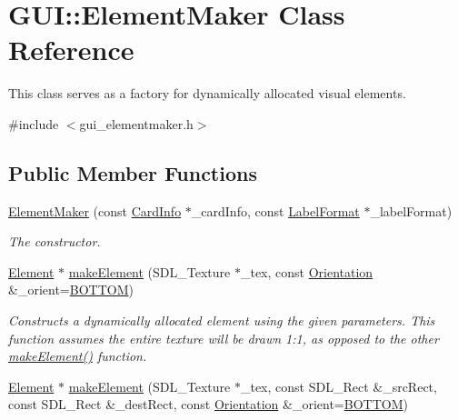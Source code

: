 \hypertarget{classGUI_1_1ElementMaker}{\section{G\-U\-I\-:\-:Element\-Maker Class Reference}
\label{classGUI_1_1ElementMaker}
}


This class serves as a factory for dynamically allocated visual elements.  




{\ttfamily \#include $<$gui\-\_\-elementmaker.\-h$>$}

\subsection*{Public Member Functions}
\begin{DoxyCompactItemize}
\item 
\hyperlink{classGUI_1_1ElementMaker_a5511a914978a82248057d5e12f2d4782}{Element\-Maker} (const \hyperlink{structGUI_1_1CardInfo}{Card\-Info} $\ast$\-\_\-card\-Info, const \hyperlink{structGUI_1_1LabelFormat}{Label\-Format} $\ast$\-\_\-label\-Format)
\begin{DoxyCompactList}\small\item\em The constructor. \end{DoxyCompactList}\item 
\hyperlink{classGUI_1_1Element}{Element} $\ast$ \hyperlink{classGUI_1_1ElementMaker_adc28a4059d3ae86c2dcb56dcc7edf728}{make\-Element} (S\-D\-L\-\_\-\-Texture $\ast$\-\_\-tex, const \hyperlink{namespaceGUI_a1a3a8094d47f7be06ce123fab38abf6a}{Orientation} \&\-\_\-orient=\hyperlink{namespaceGUI_a1a3a8094d47f7be06ce123fab38abf6aafb2c9cf323a63df7a7ac4ade2e4e63e5}{B\-O\-T\-T\-O\-M})
\begin{DoxyCompactList}\small\item\em Constructs a dynamically allocated element using the given parameters. This function assumes the entire texture will be drawn 1\-:1, as opposed to the other \hyperlink{classGUI_1_1ElementMaker_adc28a4059d3ae86c2dcb56dcc7edf728}{make\-Element()} function. \end{DoxyCompactList}\item 
\hyperlink{classGUI_1_1Element}{Element} $\ast$ \hyperlink{classGUI_1_1ElementMaker_a84d3cb57312c959849b4cfd5f210eeab}{make\-Element} (S\-D\-L\-\_\-\-Texture $\ast$\-\_\-tex, const S\-D\-L\-\_\-\-Rect \&\-\_\-src\-Rect, const S\-D\-L\-\_\-\-Rect \&\-\_\-dest\-Rect, const \hyperlink{namespaceGUI_a1a3a8094d47f7be06ce123fab38abf6a}{Orientation} \&\-\_\-orient=\hyperlink{namespaceGUI_a1a3a8094d47f7be06ce123fab38abf6aafb2c9cf323a63df7a7ac4ade2e4e63e5}{B\-O\-T\-T\-O\-M})

\end{DoxyCompactItemize}

